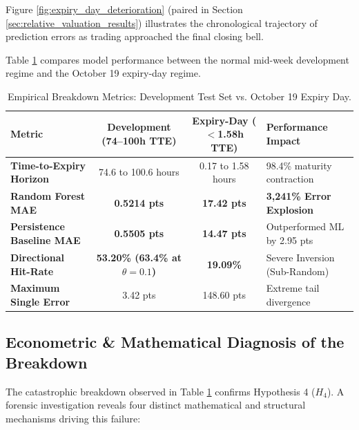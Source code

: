 Figure \ref{fig:expiry_day_deterioration} (paired in Section \ref{sec:relative_valuation_results}) illustrates the chronological trajectory of prediction errors as trading approached the final closing bell.

Table \ref{tab:expiry_day_collapse_metrics} compares model performance between the normal mid-week development regime and the October 19 expiry-day regime.

\begin{table}[H]
    \centering
    \footnotesize
    \caption{Empirical Breakdown Metrics: Development Test Set vs. October 19 Expiry Day.}
    \label{tab:expiry_day_collapse_metrics}
    \begin{tabularx}{\textwidth}{p{3.8cm}ccX}
        \toprule
        \textbf{Metric} & \textbf{Development (74--100h TTE)} & \textbf{Expiry-Day ($<$1.58h TTE)} & \textbf{Performance Impact} \\
        \midrule
        \textbf{Time-to-Expiry Horizon} & 74.6 to 100.6 hours & 0.17 to 1.58 hours & 98.4\% maturity contraction \\
        \textbf{Random Forest MAE} & \textbf{0.5214 pts} & \textbf{17.42 pts} & \textbf{3,241\% Error Explosion} \\
        \textbf{Persistence Baseline MAE} & \textbf{0.5505 pts} & \textbf{14.47 pts} & Outperformed ML by 2.95 pts \\
        \textbf{Directional Hit-Rate} & \textbf{53.20\% (63.4\% at $\theta=0.1$)} & \textbf{19.09\%} & Severe Inversion (Sub-Random) \\
        \textbf{Maximum Single Error} & 3.42 pts & 148.60 pts & Extreme tail divergence \\
        \bottomrule
    \end{tabularx}
\end{table}

\subsection{Econometric \& Mathematical Diagnosis of the Breakdown}
The catastrophic breakdown observed in Table \ref{tab:expiry_day_collapse_metrics} confirms Hypothesis 4 ($H_4$). A forensic investigation reveals four distinct mathematical and structural mechanisms driving this failure:

